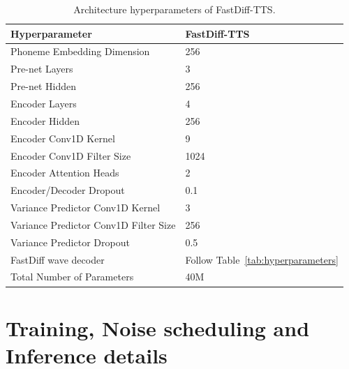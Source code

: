 \begin{table}[H]
    \begin{minipage}[t]{\linewidth}
        \centering
        \begin{tabular}{l|l}
        \hline
        \textbf{Hyperparameter}               &  \textbf{FastDiff-TTS}  \\
        \toprule
        Phoneme Embedding Dimension             &  256                   \\ 
        Pre-net Layers                          &      3                         \\ 
        Pre-net Hidden                        &     256                          \\ 
        Encoder Layers                         &      4                       \\ 
        Encoder Hidden                         &      256                         \\
        Encoder Conv1D Kernel                  &       9                         \\ 
        Encoder Conv1D Filter Size             &      1024                         \\
        Encoder Attention Heads                &      2                       \\
        Encoder/Decoder Dropout                &      0.1                     \\
        Variance Predictor Conv1D Kernel       &  3                          \\ 
        Variance Predictor Conv1D Filter Size  &  256                      \\ 
        Variance Predictor Dropout              &   0.5                 \\ 
        FastDiff wave decoder               &   Follow Table~\ref{tab:hyperparameters}              \\ 
        \midrule
        Total Number of Parameters            &           40M	         \\
        \bottomrule
        \end{tabular}
        \caption{Architecture hyperparameters of FastDiff-TTS.}
        \label{tab:hyperparameters_tts}
        \end{minipage}
\end{table}

\section{Training, Noise scheduling and Inference details}  \label{appendix:Training}

